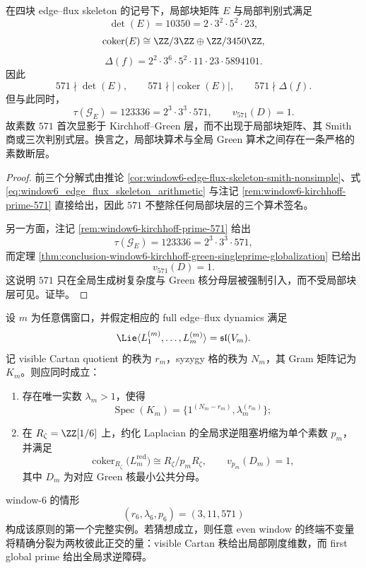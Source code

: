 \begin{theorem}\label{thm:conclusion-window6-local-global-prime-faultline}
在四块 edge--flux skeleton 的记号下，局部块矩阵 \(E\) 与局部判别式满足
\[
\det(E)=10350=2\cdot 3^2\cdot 5^2\cdot 23,
\]
\[
\operatorname{coker}(E)\cong \ZZ/3\ZZ\oplus \ZZ/3450\ZZ,
\]
\[
\Delta(f)=2^2\cdot 3^6\cdot 5^2\cdot 11\cdot 23\cdot 5894101.
\]
因此
\[
571\nmid \det(E),
\qquad
571\nmid |\operatorname{coker}(E)|,
\qquad
571\nmid \Delta(f).
\]
但与此同时，
\[
\tau(\mathcal G_E)=123336=2^3\cdot 3^3\cdot 571,
\qquad
v_{571}(D)=1.
\]
故素数 \(571\) 首次显影于 Kirchhoff--Green 层，而不出现于局部块矩阵、其 Smith 商或三次判别式层。换言之，局部块算术与全局 Green 算术之间存在一条严格的素数断层。
\end{theorem}
\begin{proof}
前三个分解式由推论 \ref{cor:window6-edge-flux-skeleton-smith-nonsimple}、式 \eqref{eq:window6_edge_flux_skeleton_arithmetic} 与注记 \ref{rem:window6-kirchhoff-prime-571} 直接给出，因此 \(571\) 不整除任何局部块层的三个算术签名。

另一方面，注记 \ref{rem:window6-kirchhoff-prime-571} 给出
\[
\tau(\mathcal G_E)=123336=2^3\cdot 3^3\cdot 571,
\]
而定理 \ref{thm:conclusion-window6-kirchhoff-green-singleprime-globalization} 已给出
\[
v_{571}(D)=1.
\]
这说明 \(571\) 只在全局生成树复杂度与 Green 核分母层被强制引入，而不受局部块层可见。证毕。
\end{proof}

\begin{conjecture}\label{conj:conclusion-window6-rank-prime-dual-rigidity}
设 \(m\) 为任意偶窗口，并假定相应的 full edge--flux dynamics 满足
\[
\Lie\langle L_1^{(m)},\dots,L_m^{(m)}\rangle=\mathfrak{sl}(V_m).
\]
记 visible Cartan quotient 的秩为 \(r_m\)，syzygy 格的秩为 \(N_m\)，其 Gram 矩阵记为 \(K_m\)。则应同时成立：
\begin{enumerate}
  \item 存在唯一实数 \(\lambda_m>1\)，使得
  \[
  \operatorname{Spec}(K_m)=\{1^{(N_m-r_m)},\lambda_m^{(r_m)}\};
  \]
  \item 在 \(R_\zeta=\ZZ[1/6]\) 上，约化 Laplacian 的全局求逆阻塞坍缩为单个素数 \(p_m\)，并满足
  \[
  \operatorname{coker}_{R_\zeta}\bigl(L_m^{\mathrm{red}}\bigr)\cong R_\zeta/p_mR_\zeta,
  \qquad
  v_{p_m}(D_m)=1,
  \]
  其中 \(D_m\) 为对应 Green 核最小公共分母。
\end{enumerate}
window-\(6\) 的情形
\[
(r_6,\lambda_6,p_6)=(3,11,571)
\]
构成该原则的第一个完整实例。若猜想成立，则任意 even window 的终端不变量将精确分裂为两枚彼此正交的量：visible Cartan 秩给出局部刚度维数，而 first global prime 给出全局求逆障碍。
\end{conjecture}

